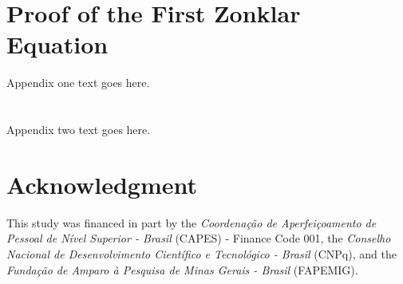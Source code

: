 \documentclass[journal]{IEEEtran}
\begin{document}
\appendices
\section{Proof of the First Zonklar Equation}
Appendix one text goes here.

\section{}
Appendix two text goes here.


\section*{Acknowledgment}
This study was financed in part by the \emph{Coordenação de Aperfeiçoamento de Pessoal de Nível Superior - Brasil} (CAPES) - Finance Code 001, the \emph{Conselho Nacional de Desenvolvimento Científico e Tecnológico - Brasil} (CNPq), and the \emph{Fundação de Amparo à Pesquisa de Minas Gerais - Brasil} (FAPEMIG).

\ifCLASSOPTIONcaptionsoff
  \newpage
\fi








% 
\end{document}
